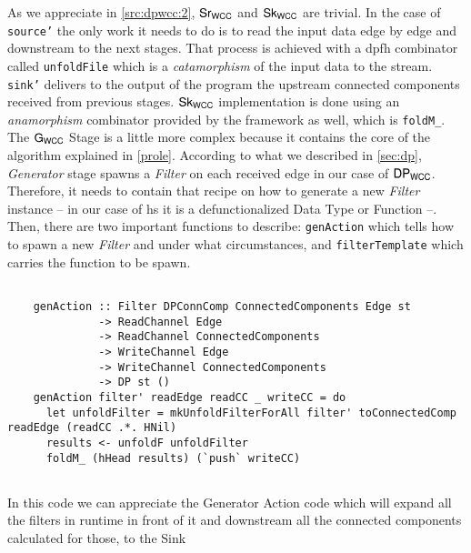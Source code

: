 As we appreciate in \autoref{src:dpwcc:2}, $\mathsf{Sr_{WCC}}$ and $\mathsf{Sk_{WCC}}$ are trivial. In the case of \texttt{source'} the only work it needs to do is to read the input data edge by edge and downstream to the next stages. 
That process is achieved with a \acrshort{dpfh} combinator called \texttt{unfoldFile} which is a \emph{catamorphism} of the input data to the stream.
\texttt{sink'} delivers to the output of the program the upstream connected components received from previous stages. $\mathsf{Sk_{WCC}}$ implementation is done using an \emph{anamorphism} combinator provided by the framework as well, which is \texttt{foldM_}.
The $\mathsf{G_{WCC}}$ Stage is a little more complex because it contains the core of the algorithm explained in \autoref{prole}. According to what we described in \autoref{sec:dp}, \textit{Generator} stage spawns a \textit{Filter} on each received edge in our case of $\mathsf{DP_{WCC}}$.
Therefore, it needs to contain that recipe on how to generate a new \textit{Filter} instance -- in our case of \acrshort{hs} it is a defunctionalized Data Type or Function --. 
Then, there are two important functions to describe: \texttt{genAction} which tells how to spawn a new \textit{Filter} and under what circumstances, and \texttt{filterTemplate} which carries the function to be spawn.

\begin{listing}[H]
  \begin{verbatim}
    
    genAction :: Filter DPConnComp ConnectedComponents Edge st
              -> ReadChannel Edge
              -> ReadChannel ConnectedComponents
              -> WriteChannel Edge
              -> WriteChannel ConnectedComponents
              -> DP st ()
    genAction filter' readEdge readCC _ writeCC = do
      let unfoldFilter = mkUnfoldFilterForAll filter' toConnectedComp readEdge (readCC .*. HNil) 
      results <- unfoldF unfoldFilter
      foldM_ (hHead results) (`push` writeCC)
        
  \end{verbatim}
  \caption[{[\texttt{ConnectedComp.hs}] Generator Action Code}]{In this code we can appreciate the Generator Action code which will expand all the filters in runtime in front of it and downstream all the connected components calculated for those, to the Sink}
  \label{src:dpwcc:3}
\end{listing}

